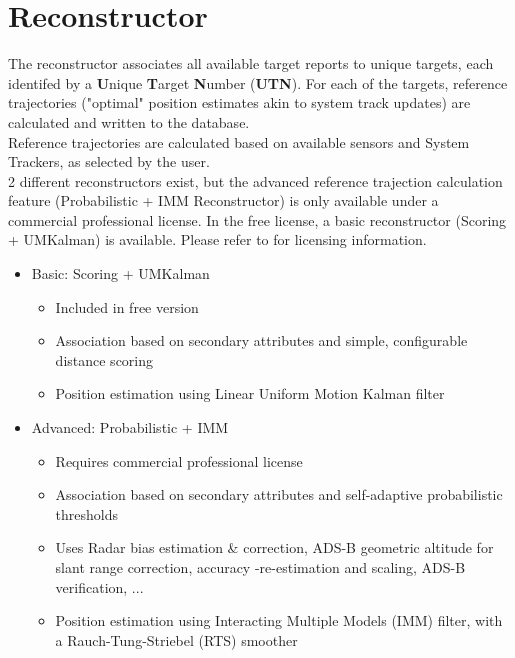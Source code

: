 \chapter{Reconstructor}
\label{sec:reconst} 

The reconstructor associates all available target reports to unique targets, each identifed by a \textbf{U}nique \textbf{T}arget \textbf{N}umber (\textbf{UTN}). For each of the targets, reference trajectories ("optimal" position estimates akin to system track updates) are calculated and written to the database. \\

Reference trajectories are calculated based on available sensors and System Trackers, as selected by the user. \\

2 different reconstructors exist, but the advanced reference trajection calculation feature (Probabilistic + IMM Reconstructor) is only available under a commercial professional license. In the free license, a basic reconstructor (Scoring + UMKalman) is available. Please refer to  for licensing information. \\

\begin{itemize}  
   \item Basic: Scoring + UMKalman
   \begin{itemize}  
   \item Included in free version
   \item Association based on secondary attributes and simple, configurable distance scoring
   \item Position estimation using Linear Uniform Motion Kalman filter
   \end{itemize}  
   \item Advanced: Probabilistic + IMM
   \begin{itemize}  
   \item Requires commercial professional license
   \item Association based on secondary attributes and self-adaptive probabilistic thresholds
   \item Uses Radar bias estimation \& correction, ADS-B geometric altitude for slant range correction, accuracy -re-estimation and scaling, ADS-B verification, ...
   \item Position estimation using Interacting Multiple Models (IMM) filter, with a Rauch-Tung-Striebel (RTS) smoother
   \end{itemize}
\end{itemize}  

